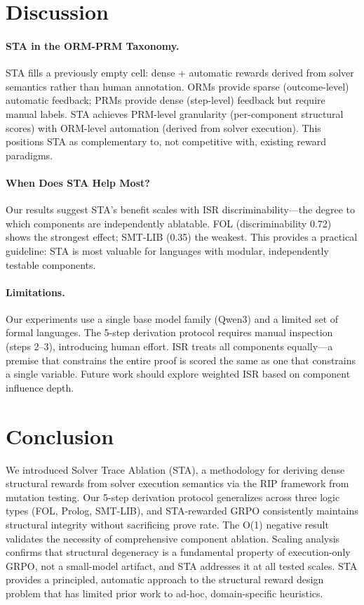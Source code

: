\documentclass[11pt,a4paper]{article}
\begin{document}
\section{Discussion}
\label{sec:discussion}

\paragraph{STA in the ORM-PRM Taxonomy.}
STA fills a previously empty cell: dense + automatic rewards derived from solver semantics rather than human annotation. ORMs provide sparse (outcome-level) automatic feedback; PRMs provide dense (step-level) feedback but require manual labels. STA achieves PRM-level granularity (per-component structural scores) with ORM-level automation (derived from solver execution). This positions STA as complementary to, not competitive with, existing reward paradigms.

\paragraph{When Does STA Help Most?}
Our results suggest STA's benefit scales with ISR discriminability---the degree to which components are independently ablatable. FOL (discriminability 0.72) shows the strongest effect; SMT-LIB (0.35) the weakest. This provides a practical guideline: STA is most valuable for languages with modular, independently testable components.

\paragraph{Limitations.}
Our experiments use a single base model family (Qwen3) and a limited set of formal languages. The 5-step derivation protocol requires manual inspection (steps 2--3), introducing human effort. ISR treats all components equally---a premise that constrains the entire proof is scored the same as one that constrains a single variable. Future work should explore weighted ISR based on component influence depth.

\section{Conclusion}
\label{sec:conclusion}

We introduced Solver Trace Ablation (STA), a methodology for deriving dense structural rewards from solver execution semantics via the RIP framework from mutation testing. Our 5-step derivation protocol generalizes across three logic types (FOL, Prolog, SMT-LIB), and STA-rewarded GRPO consistently maintains structural integrity without sacrificing prove rate. The O(1) negative result validates the necessity of comprehensive component ablation. Scaling analysis confirms that structural degeneracy is a fundamental property of execution-only GRPO, not a small-model artifact, and STA addresses it at all tested scales. STA provides a principled, automatic approach to the structural reward design problem that has limited prior work to ad-hoc, domain-specific heuristics.
\end{document}
